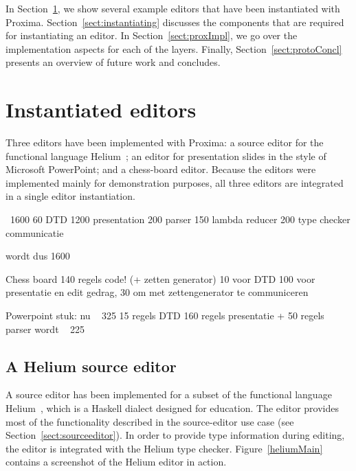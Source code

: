 In Section~\ref{sect:sampleEditors}, we show several example editors that have been instantiated with Proxima. Section~\ref{sect:instantiating} discusses the components that are required for instantiating an editor. In Section~\ref{sect:proxImpl}, we go over the implementation aspects for each of the layers. Finally, Section~\ref{sect:protoConcl} presents an overview of future work and concludes.

\section{Instantiated editors} \label{sect:sampleEditors}

Three editors have been implemented with Proxima: a source editor for the functional language Helium~\cite{heeren03helium}; an editor for presentation slides in the style of Microsoft PowerPoint; and a chess-board editor. Because the editors were implemented mainly for demonstration purposes, all three editors are integrated in a single editor instantiation.



\bc
~1600
60   DTD
1200 presentation
200  parser
150  lambda reducer
200  type checker communicatie

wordt dus 1600


Chess board 140 regels code!   (+ zetten generator)
10 voor DTD
100 voor presentatie en edit gedrag, 
30 om met zettengenerator te communiceren


Powerpoint stuk: nu ~ 325     15 regels DTD 160 regels presentatie + 50 regels parser 
wordt ~ 225  
\ec


\subsection{A Helium source editor}



A source editor has been implemented for a subset of the functional language Helium~\cite{heeren03helium}, which is a  Haskell dialect designed for education. The editor provides most of the functionality described in the source-editor use case (see Section~\ref{sect:sourceeditor}). In order to provide type information during editing, the editor is integrated with the Helium type checker. Figure~\ref{heliumMain} contains a screenshot of the Helium editor in action. 



